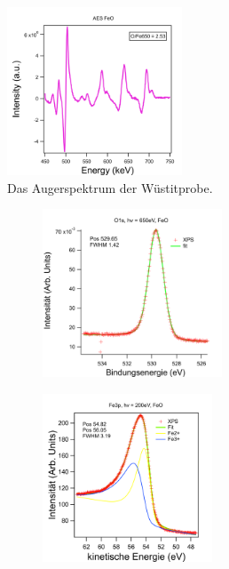         \begin{figure}
            \centering
            \includegraphics[height=5cm]{./content/pictures/FeO/AES_FeO.png}
            \caption{Das Augerspektrum der Wüstitprobe.}
            \label{fig:Auger_FeO}
        \end{figure}
        \begin{figure}
            \centering
            \begin{subfigure}[t]{0.48\textwidth}
                \centering
                \includegraphics[height=5cm]{./content/pictures/FeO/O1s_FeO.png}
                \label{fig:XPSO1s_FeO}
            \end{subfigure}
            \begin{subfigure}[t]{0.48\textwidth}
                \centering
                \includegraphics[height=5cm]{./content/pictures/FeO/Fe3p_FeO.png}
                \label{fig:XPSFe3p_FeO}
            \end{subfigure}
            \caption{}
            \label{fig:XPS_FeO}
        \end{figure}
